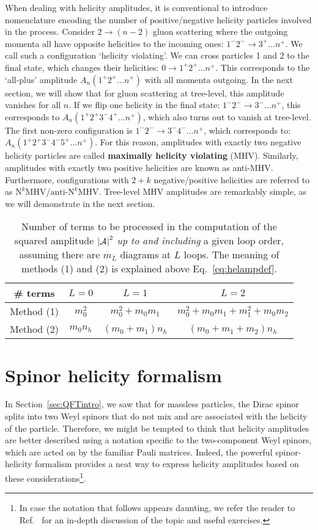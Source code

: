 \documentclass[main.tex]{subfiles}
\begin{document}
When dealing with helicity amplitudes, it is conventional to introduce nomenclature encoding the number of positive/negative helicity particles involved in the process. Consider $2\rightarrow (n-2)$ gluon scattering where the outgoing momenta all have opposite helicities to the incoming ones: $1^-2^- \rightarrow 3^+ \ldots n^+$. We call such a configuration `helicity violating'. We can cross particles 1 and 2 to the final state, which changes their helicities: $0\rightarrow 1^+2^+ \ldots n^+$. This corresponds to the `all-plus' amplitude $A_n(1^+2^+ \ldots n^+)$ with all momenta outgoing. In the next section, we will show that for gluon scattering at tree-level, this amplitude vanishes for all $n$. If we flip one helicity in the final state: $1^-2^- \rightarrow 3^- \ldots n^+$, this corresponds to $A_n(1^+2^+3^-4^+ \ldots n^+)$, which also turns out to vanish at tree-level. The first non-zero configuration is $1^-2^- \rightarrow 3^-4^- \ldots n^+$, which corresponds to: $A_n(1^+2^+3^-4^-5^+ \ldots n^+)$. For this reason, amplitudes with exactly two negative helicity particles are called \textbf{maximally helicity violating} (MHV). Similarly, amplitudes with exactly two positive helicities are known as anti-MHV. Furthermore, configurations with $2+k$ negative/positive helicities are referred to as $\text{N}^k\text{MHV}/\text{anti-N}^k\text{MHV}$. Tree-level MHV amplitudes are remarkably simple, as we will demonstrate in the next section. 
\begin{table}[t]
	\begin{center}
		\begin{tabular}{c|c|c|c}
			  \# terms & $L=0$ & $L=1$ & $L=2$ \\
			\hline
			Method (1) & $m_0^2$ & $m_0^2 + m_0 m_1$ & $m_0^2 + m_0 m_1 + m_1^2 + m_0 m_2$ \\
			Method (2) & $m_0 n_h$ & $(m_0+m_1)n_h$ & $(m_0+m_1+m_2)n_h$ \\
		\end{tabular}
	\end{center}
 \caption{Number of terms to be processed in the computation of the squared amplitude $\left|\mathcal{A}_{}^{}\right|^2$ \textit{up to and including} a given loop order, assuming there are $m_L$ diagrams at $L$ loops. The meaning of methods (1) and (2) is explained above Eq.~\ref{eq:helampdef}.}
 \label{tab:nterms}
\end{table}
\section{Spinor helicity formalism} \label{sec:spinhelform}
In Section~\ref{sec:QFTintro}, we saw that for massless particles, the Dirac spinor splits into two Weyl spinors that do not mix and are associated with the helicity of the particle. Therefore, we might be tempted to think that helicity amplitudes are better described using a notation specific to the two-component Weyl spinors, which are acted on by the familiar Pauli matrices. Indeed, the powerful spinor-helicity formalism provides a neat way to express helicity amplitudes based on these considerations\footnote{In case the notation that follows appears daunting, we refer the reader to Ref.~\cite{ElvangHuang} for an in-depth discussion of the topic and useful exercises.}.
\end{document}

